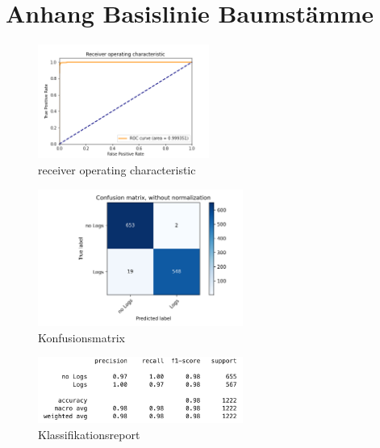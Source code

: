 \chapter{Anhang Basislinie Baumstämme}
\label{appendix:BasislinieBaumstämme}

\begin{figure}[h]
	\centering
	\includegraphics[width=0.5\textwidth, center]{bilder/Anhang/Baseline/Logs/Logs_validation/Logs_Baseline_ROC.png}
	\caption[Baumstammklassifikation Basislinie ROC]{receiver operating characteristic}
	\label{img:BaselineLogsROC}
\end{figure}	

\begin{figure}[h]
	\centering
	\includegraphics[width=0.6\textwidth, center]{bilder/Anhang/Baseline/Logs/Logs_validation/Logs_Baseline_Confusion_Matrix.png}
	\caption[Konfusionsmatrix Baumstammklassifikation Basislinie]{Konfusionsmatrix}
	\label{img:BaselineLogsConfusionMatrix}
\end{figure}	

\begin{figure}[h]
	\centering
	\includegraphics[width=0.6\textwidth, center]{bilder/Anhang/Baseline/Logs/Logs_validation/classification_report.png}
	\caption[Klassifikationsreport Baumstammklassifikation Basislinie]{Klassifikationsreport}
	\label{img:BaselineLogsKlassifikationsreport}
\end{figure}	
